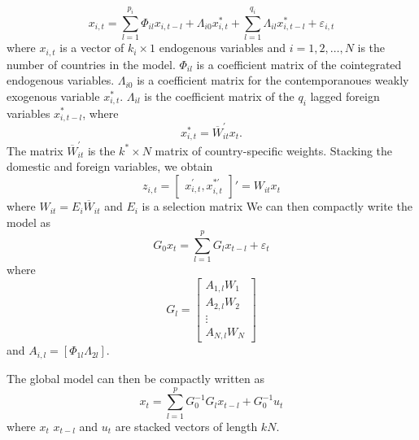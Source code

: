 \documentclass[titlepage,oneside,12pt]{article}
\newcommand{\?}{\stackrel{?}{=}}
\newcommand{\ol}{\overline}
\begin{document}
\begin{equation}
  \label{eq:1}
  x_{i,t} = \sum_{l=1}^{p_{i}}\Phi_{il}x_{i,t-l} + \Lambda_{i0}x_{i,t}^{*} + \sum_{l=1}^{q_{i}}\Lambda_{il}x_{i,t-l}^{*} + \varepsilon_{i,t}
\end{equation}
where $x_{i,t}$ is a vector of $k_{i}\times 1$ endogenous variables and $i = 1, 2, \ldots, N$ is the number of countries in the model.
$\Phi_{il}$ is a coefficient matrix of the cointegrated endogenous variables. $\Lambda_{i0}$ is a coefficient matrix for the contemporanoues weakly exogenous variable $x_{i,t}^{*}$. $\Lambda_{il}$ is the coefficient matrix of the $q_{i}$ lagged foreign variables $x_{i,t-l}^{*}$, where
\begin{equation}
  \label{eq:2}
  x_{i,t}^{*} = \ol{W}_{it}^{'}x_{t}.
\end{equation}
The matrix $\ol{W}_{it}^{'}$ is the $k^{*} \times N$ matrix of country-specific weights.
Stacking the domestic and foreign variables, we obtain
\begin{equation}
  \label{eq:3}
  z_{i,t} =
  \begin{bmatrix}
    x_{i,t}^{'}, x_{i,t}^{*'}
  \end{bmatrix}'  = W_{it}x_{t}
\end{equation}
where $W_{it} = E_{i}\ol{W}_{it}$ and $E_{i}$ is a selection matrix We
can then compactly write the model as
\begin{equation}
  \label{eq:4}
  G_{0}x_{t} = \sum_{l=1}^{p}G_{l}x_{t-l} + \varepsilon_{t}
\end{equation}
where
\begin{equation}
  \label{eq:5}
  G_{l} =
  \begin{bmatrix}
    A_{1,l}W_{1}\\ A_{2,l}W_{2}\\ \vdots \\A_{N,l}W_{N}
  \end{bmatrix}
\end{equation}
and $A_{i,l} = [\Phi_{1l}  \Lambda_{2l}]$.

The global model can then be compactly written as
\begin{equation}
  \label{eq:6}
  x_{t} = \sum_{l=1}^{p}G_{0}^{-1}G_{l }x_{t-l} + G_{0}^{-1}u_{t}
\end{equation}
where $x_{t}$ $x_{t-l}$ and $u_{t}$ are stacked vectors of length $kN$.
\end{document}
